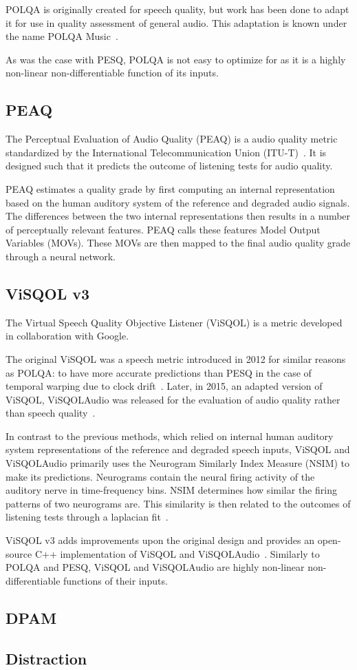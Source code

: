 POLQA is originally created for speech quality, but work has been done to adapt it for use in quality assessment of
general audio.
This adaptation is known under the name POLQA Music~\cite{povcta2015subjective}.

As was the case with PESQ, POLQA is not easy to optimize for as it is a highly non-linear non-differentiable function of
its inputs.


\subsection{PEAQ}
The Perceptual Evaluation of Audio Quality (PEAQ) is a audio quality metric standardized by the 
International Telecommunication Union (ITU-T)~\cite{thiede2000peaq}.
It is designed such that it predicts the outcome of listening tests for audio quality.

PEAQ estimates a quality grade by first computing an internal representation based on the human auditory system of
the reference and degraded audio signals.
The differences between the two internal representations then results in a number of perceptually relevant features.
PEAQ calls these features Model Output Variables (MOVs).
These MOVs are then mapped to the final audio quality grade through a neural network.

\subsection{ViSQOL v3}
The Virtual Speech Quality Objective Listener (ViSQOL) is a metric developed in collaboration with Google.

The original ViSQOL was a speech metric introduced in 2012 for similar reasons as POLQA: to have more accurate 
predictions than PESQ in the case of temporal warping due to clock drift~\cite{hines2012visqol}.
Later, in 2015, an adapted version of ViSQOL, ViSQOLAudio was released for the evaluation of audio quality rather than 
speech quality~\cite{hines2015visqolaudio}.

In contrast to the previous methods, which relied on internal human auditory system representations of the reference and 
degraded speech inputs, ViSQOL and ViSQOLAudio primarily uses the Neurogram Similarly Index Measure 
(NSIM) to make its predictions.
Neurograms contain the neural firing activity of the auditory nerve in time-frequency bins.
NSIM determines how similar the firing patterns of two neurograms are.
This similarity is then related to the outcomes of listening tests through a laplacian fit~\cite{hines2012visqol}.

ViSQOL v3 adds improvements upon the original design and provides an open-source C++ 
implementation of ViSQOL and ViSQOLAudio~\cite{chinen2020visqol}.
Similarly to POLQA and PESQ, ViSQOL and ViSQOLAudio are highly non-linear non-differentiable functions of their inputs.

\subsection{DPAM}
\subsection{Distraction}
